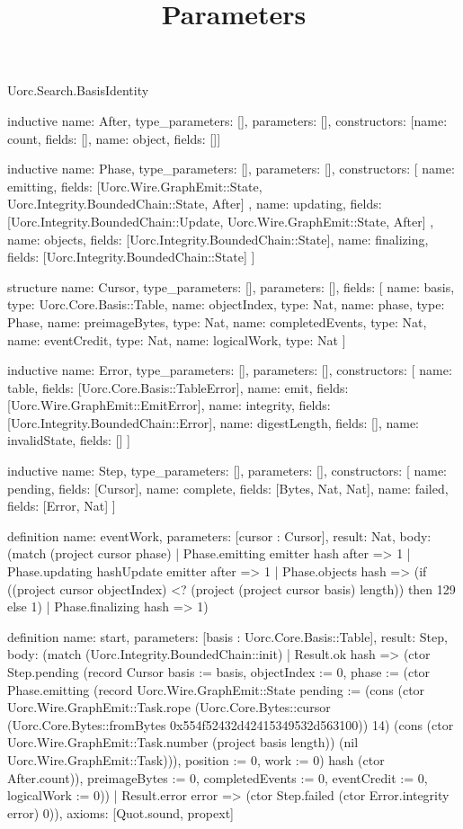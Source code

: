 \begin{lexlean}{Uorc.Search.BasisIdentity}
\title{Parameters}
\begin{semanticmodule}
inductive{
  name: After,
  type_parameters: [],
  parameters: [],
  constructors: [{name: count, fields: []}, {name: object, fields: []}]
}

inductive{
  name: Phase,
  type_parameters: [],
  parameters: [],
  constructors: [
    {
      name: emitting,
      fields: [Uorc.Wire.GraphEmit::State, Uorc.Integrity.BoundedChain::State, After]
    },
    {
      name: updating,
      fields: [Uorc.Integrity.BoundedChain::Update, Uorc.Wire.GraphEmit::State, After]
    },
    {name: objects, fields: [Uorc.Integrity.BoundedChain::State]},
    {name: finalizing, fields: [Uorc.Integrity.BoundedChain::State]}
  ]
}

structure{
  name: Cursor,
  type_parameters: [],
  parameters: [],
  fields: [
    {name: basis, type: Uorc.Core.Basis::Table},
    {name: objectIndex, type: Nat},
    {name: phase, type: Phase},
    {name: preimageBytes, type: Nat},
    {name: completedEvents, type: Nat},
    {name: eventCredit, type: Nat},
    {name: logicalWork, type: Nat}
  ]
}

inductive{
  name: Error,
  type_parameters: [],
  parameters: [],
  constructors: [
    {name: table, fields: [Uorc.Core.Basis::TableError]},
    {name: emit, fields: [Uorc.Wire.GraphEmit::EmitError]},
    {name: integrity, fields: [Uorc.Integrity.BoundedChain::Error]},
    {name: digestLength, fields: []},
    {name: invalidState, fields: []}
  ]
}

inductive{
  name: Step,
  type_parameters: [],
  parameters: [],
  constructors: [
    {name: pending, fields: [Cursor]},
    {name: complete, fields: [Bytes, Nat, Nat]},
    {name: failed, fields: [Error, Nat]}
  ]
}

definition{
  name: eventWork,
  parameters: [cursor : Cursor],
  result: Nat,
  body: (match (project cursor phase)
    | Phase.emitting emitter hash after => 1
    | Phase.updating hashUpdate emitter after => 1
    | Phase.objects hash => (if ((project cursor objectIndex) <? (project (project cursor basis) length)) then 129 else 1)
    | Phase.finalizing hash => 1)
}

definition{
  name: start,
  parameters: [basis : Uorc.Core.Basis::Table],
  result: Step,
  body: (match (Uorc.Integrity.BoundedChain::init)
    | Result.ok hash => (ctor Step.pending (record Cursor {basis := basis, objectIndex := 0, phase := (ctor Phase.emitting (record Uorc.Wire.GraphEmit::State {pending := (cons (ctor Uorc.Wire.GraphEmit::Task.rope (Uorc.Core.Bytes::cursor (Uorc.Core.Bytes::fromBytes 0x554f52432d42415349532d563100)) 14) (cons (ctor Uorc.Wire.GraphEmit::Task.number (project basis length)) (nil Uorc.Wire.GraphEmit::Task))), position := 0, work := 0}) hash (ctor After.count)), preimageBytes := 0, completedEvents := 0, eventCredit := 0, logicalWork := 0}))
    | Result.error error => (ctor Step.failed (ctor Error.integrity error) 0)),
  axioms: [Quot.sound, propext]
}


\end{semanticmodule}
\end{lexlean}
